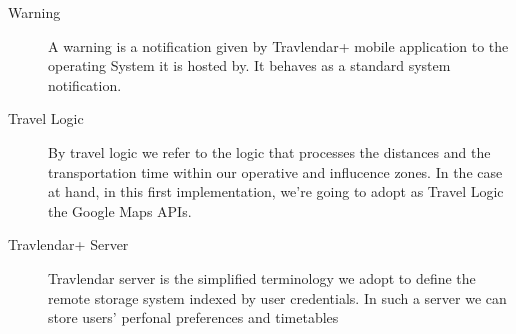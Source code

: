 \begin{description}
				\item[Warning] A warning is a notification given by Travlendar+ mobile application to the operating System it is hosted by. It behaves as a standard system notification.
				\item[Travel Logic] By travel logic we refer to the logic that processes the distances and the transportation time within our operative and influcence zones. In the case at hand, in this first implementation, we're going to adopt as Travel Logic the Google Maps APIs.
				\item [Travlendar+ Server] Travlendar server is the simplified terminology we adopt to define the remote storage system indexed by user credentials. In such a server we can store users' perfonal preferences and timetables  
\end{description}
